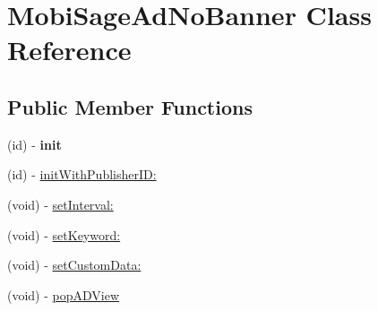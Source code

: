 \hypertarget{interface_mobi_sage_ad_no_banner}{\section{\-Mobi\-Sage\-Ad\-No\-Banner \-Class \-Reference}
\label{interface_mobi_sage_ad_no_banner}
}
\subsection*{\-Public \-Member \-Functions}
\begin{DoxyCompactItemize}
\item 
\hypertarget{interface_mobi_sage_ad_no_banner_aaf3679b580a198e4268853e27402c4a4}{(id) -\/ {\bfseries init}}\label{interface_mobi_sage_ad_no_banner_aaf3679b580a198e4268853e27402c4a4}

\item 
(id) -\/ \hyperlink{interface_mobi_sage_ad_no_banner_a811bda1a5da24eecc483eccf6499666d}{init\-With\-Publisher\-I\-D\-:}
\item 
(void) -\/ \hyperlink{interface_mobi_sage_ad_no_banner_ab9e4758a9015fe1863459de3e4d3581e}{set\-Interval\-:}
\item 
(void) -\/ \hyperlink{interface_mobi_sage_ad_no_banner_a322bb17eb7f740878571601765335702}{set\-Keyword\-:}
\item 
(void) -\/ \hyperlink{interface_mobi_sage_ad_no_banner_a95592b458986d46a1f05cc9126fe5bb6}{set\-Custom\-Data\-:}
\item 
(void) -\/ \hyperlink{interface_mobi_sage_ad_no_banner_af27dc0c8c551fd23c40a79b385d894a9}{pop\-A\-D\-View}
\end{DoxyCompactItemize}


